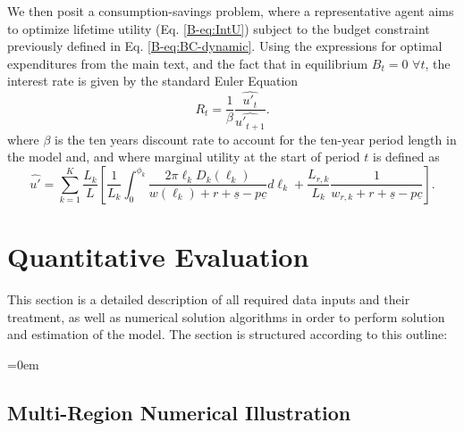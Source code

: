 \documentclass[11pt]{report}
\newlength\tocrulewidth
\begin{document}
We then posit a consumption-savings problem, where a representative agent aims to optimize lifetime utility (Eq. \ref{B-eq:IntU}) subject to the budget constraint previously defined in Eq. \eqref{B-eq:BC-dynamic}.
Using the expressions for optimal expenditures from the main text, and the fact that in equilibrium $B_t=0$ $\forall t$, the interest rate is given by the standard Euler Equation
\begin{equation}
	R_t=\frac{1}{\beta}\frac{\widehat{u'_t}}{\widehat{u'_{t+1}}}.\label{B-eq:Euler-Equation}
\end{equation}
where $\beta$ is the ten years discount rate to account for the ten-year period length in the model and, and where marginal utility at the start of period $t$ is defined as
\begin{equation}
	\widehat{u'}= \sum_{k=1}^K \frac{L_k}{L} \left[ \frac{1}{L_k}\int_0^{\phi_k} \frac{2 \pi \ell_k D_k(\ell_k)}{w(\ell_k)+r + \underline{s} -p\underline{c}} d\ell_k+\frac{L_{r,k}}{L_k}\frac{1}{w_{r,k} +r + \underline{s} -p\underline{c}}  \right]. \label{B-eq:Emu}
\end{equation}


\newpage

\section{Quantitative Evaluation}\label{B-sec:quant-evaluation}

This section is a detailed description of all required data inputs and their treatment, as well as numerical solution algorithms in order to perform solution and estimation of the model. The section is structured according to this outline:

\begingroup
\parindent=0em
\localtableofcontents 
\endgroup

\subsection{Multi-Region Numerical Illustration}\label{B-sec:numillus_new}
\end{document}
